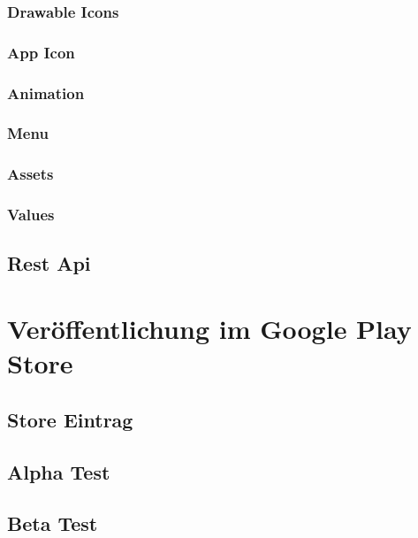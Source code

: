 \documentclass{scrartcl}
\begin{document}
\subsubsection{Drawable Icons}

\subsubsection{App Icon}

\subsubsection{Animation}

\subsubsection{Menu}

\subsubsection{Assets}

\subsubsection{Values}

\subsection{Rest Api}


\newpage

\section{Veröffentlichung im Google Play Store}

\subsection{Store Eintrag}

\subsection{Alpha Test}

\subsection{Beta Test}


\newpage
\end{document}
